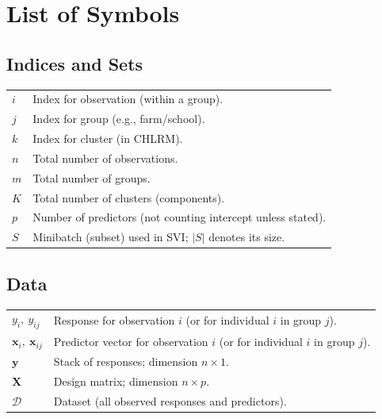 \chapter*{List of Symbols}

\newcommand{\vect}[1]{\bm{#1}}
\newcommand{\mat}[1]{\mathbf{#1}}

\section*{Indices and Sets}
\begin{tabularx}{\textwidth}{>{\raggedright\arraybackslash}p{2.6cm} X}
$i$ & Index for observation (within a group). \\
$j$ & Index for group (e.g., farm/school). \\
$k$ & Index for cluster (in CHLRM). \\
$n$ & Total number of observations. \\
$m$ & Total number of groups. \\
$K$ & Total number of clusters (components). \\
$p$ & Number of predictors (not counting intercept unless stated). \\
$S$ & Minibatch (subset) used in SVI; $|S|$ denotes its size. \\
\end{tabularx}

\vspace{0.5em}
\section*{Data}
\begin{tabularx}{\textwidth}{>{\raggedright\arraybackslash}p{2.6cm} X}
$y_i,\ y_{ij}$ & Response for observation $i$ (or for individual $i$ in group $j$). \\
$\vect{x}_i,\ \vect{x}_{ij}$ & Predictor vector for observation $i$ (or for individual $i$ in group $j$). \\
$\vect{y}$ & Stack of responses; dimension $n \times 1$. \\
$\mat{X}$ & Design matrix; dimension $n \times p$. \\
$\mathcal{D}$ & Dataset (all observed responses and predictors). \\
\end{tabularx}

\vspace{0.5em}
